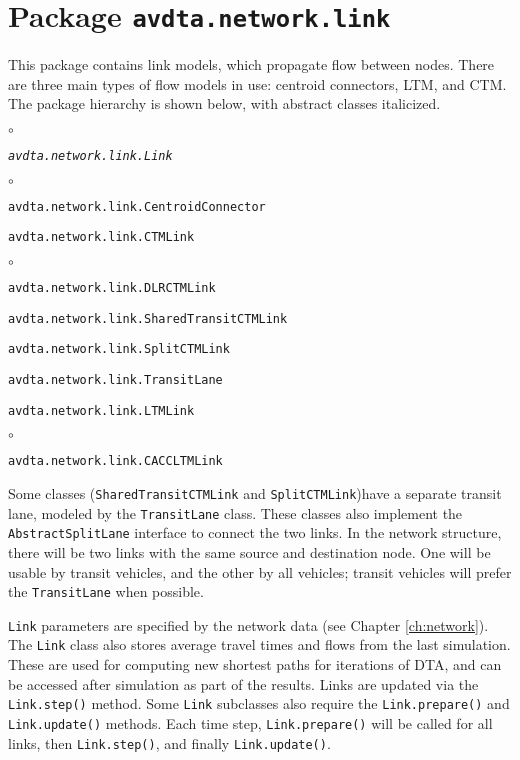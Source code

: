 \section{Package \texttt{avdta.network.link}}

This package contains link models, which propagate flow between nodes. There are three main types of flow models in use: centroid connectors, LTM, and CTM. The package hierarchy is shown below, with abstract classes italicized.
%
\begin{list}{$\circ$}{}
	\item \texttt{\textit{avdta.network.link.Link}}
	\begin{list}{$\circ$}{}
		\item \texttt{avdta.network.link.CentroidConnector}
		\item \texttt{avdta.network.link.CTMLink}
		
		\begin{list}{$\circ$}{}
			\item \texttt{avdta.network.link.DLRCTMLink}
			\item \texttt{avdta.network.link.SharedTransitCTMLink}
			\item \texttt{avdta.network.link.SplitCTMLink}
			\item \texttt{avdta.network.link.TransitLane}
		\end{list}
		\item \texttt{avdta.network.link.LTMLink}
		
		\begin{list}{$\circ$}{}
			\item \texttt{avdta.network.link.CACCLTMLink}
		\end{list}
	\end{list}
\end{list}
Some classes (\texttt{SharedTransitCTMLink} and \texttt{SplitCTMLink})have a separate transit lane, modeled by the \texttt{TransitLane} class. These classes also implement the \texttt{AbstractSplitLane} interface to connect the two links. In the network structure, there will be two links with the same source and destination node. One will be usable by transit vehicles, and the other by all vehicles; transit vehicles will prefer the \texttt{TransitLane} when possible.

\texttt{Link} parameters are specified by the network data (see Chapter \ref{ch:network}). The \texttt{Link} class also stores average travel times and flows from the last simulation. These are used for computing new shortest paths for iterations of DTA, and can be accessed after simulation as part of the results. Links are updated via the \texttt{Link.step()} method. Some \texttt{Link} subclasses also require the \texttt{Link.prepare()} and \texttt{Link.update()} methods. Each time step, \texttt{Link.prepare()} will be called for all links, then \texttt{Link.step()}, and finally \texttt{Link.update()}. 

